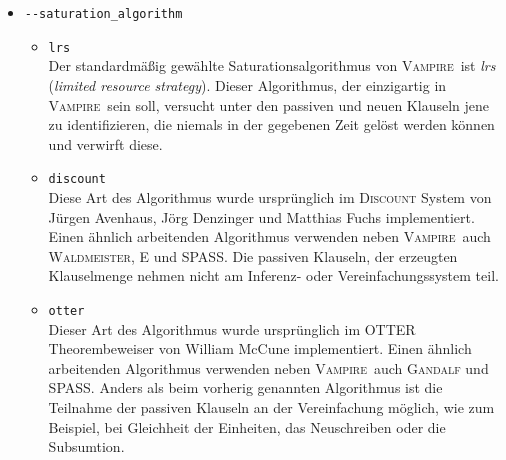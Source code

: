 \documentclass{article}
\newcommand{\vampire}{\textsc{Vampire}~}
\begin{document}
\begin{itemize}
\item \verb|--saturation_algorithm| \label{arg:saturationalgorithm}
\begin{itemize}
	\item \verb|lrs|\\
	Der standardmäßig gewählte Saturationsalgorithmus von \vampire ist \emph{lrs} (\emph{limited resource strategy}).
	Dieser Algorithmus, der einzigartig in \vampire sein soll, versucht unter den passiven und neuen Klauseln jene zu identifizieren, die niemals in der gegebenen Zeit gelöst werden können und verwirft diese. \cite{riazanov2003limited}
	\item \verb|discount|\\
	Diese Art des Algorithmus wurde ursprünglich im \textsc{Discount} System von Jürgen Avenhaus, Jörg Denzinger und Matthias Fuchs implementiert.
	Einen ähnlich arbeitenden Algorithmus verwenden neben \vampire auch \textsc{Waldmeister}, \textsc{E} und \textsc{SPASS}. 
	Die passiven Klauseln, der erzeugten Klauselmenge nehmen nicht am Inferenz- oder Vereinfachungssystem teil. \cite{riazanov2003limited} 
	\item \verb|otter|\\
	Dieser Art des Algorithmus wurde ursprünglich im OTTER Theorembeweiser von William McCune implementiert.
	Einen ähnlich arbeitenden Algorithmus verwenden neben \vampire auch \textsc{Gandalf} und \textsc{SPASS}. 
	Anders als beim vorherig genannten Algorithmus ist die Teilnahme der passiven Klauseln an der Vereinfachung möglich, wie zum Beispiel, bei Gleichheit der Einheiten, das Neuschreiben oder die Subsumtion. \cite{riazanov2003limited} 
\end{itemize}


\end{itemize}
\end{document}
